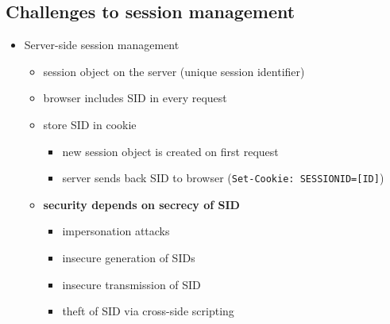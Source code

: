 \documentclass[12pt,titlepage,a4paper]{report}
\begin{document}
 	\subsection{Challenges to session management}
 	\begin{itemize}
 		\item Server-side session management
 		\begin{itemize}
 			\item session object on the server (unique session identifier)
 			\item browser includes SID in every request
 			\item store SID in cookie
 			\begin{itemize}
 				\item new session object is created on first request
 				\item server sends back SID to browser (\texttt{Set-Cookie: SESSIONID=[ID]})
 			\end{itemize}
 			\item \textbf{security depends on secrecy of SID}
 			\begin{itemize}
 				\item impersonation attacks
 				\item insecure generation of SIDs
 				\item insecure transmission of SID
 				\item theft of SID via cross-side scripting
 			\end{itemize}
 		\end{itemize}
 	

\end{itemize}
\end{document}
